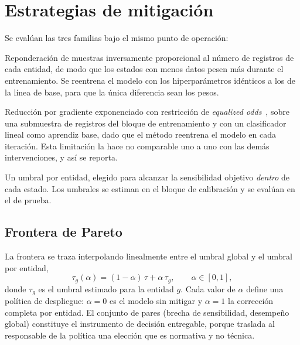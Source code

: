 \section{Estrategias de mitigación}

Se evalúan las tres familias bajo el mismo punto de operación:

\begin{description}[leftmargin=*,style=nextline]
  \item[Pre-procesamiento] Reponderación de muestras inversamente proporcional al
    número de registros de cada entidad, de modo que los estados con menos datos
    pesen más durante el entrenamiento. Se reentrena el modelo con los
    hiperparámetros idénticos a los de la línea de base, para que la única
    diferencia sean los pesos.
  \item[In-procesamiento] Reducción por gradiente exponenciado con restricción de
    \emph{equalized odds}~\parencite{fairlearn2020}, sobre una submuestra de
     registros del bloque de entrenamiento y con un clasificador
    lineal como aprendiz base, dado que el método reentrena el modelo en cada
    iteración. Esta limitación la hace no comparable uno a uno con las demás
    intervenciones, y así se reporta.
  \item[Post-procesamiento] Un umbral por entidad, elegido para alcanzar la
    sensibilidad objetivo \emph{dentro} de cada estado. Los umbrales se estiman en
    el bloque de calibración y se evalúan en el de prueba.
\end{description}

\subsection{Frontera de Pareto}

La frontera se traza interpolando linealmente entre el umbral global y el umbral
por entidad,
\begin{equation}
  \tau_g(\alpha) = (1-\alpha)\,\tau + \alpha\,\tau_g,
  \qquad \alpha \in [0,1],
\end{equation}
donde $\tau_g$ es el umbral estimado para la entidad $g$. Cada valor de $\alpha$
define una política de despliegue: $\alpha=0$ es el modelo sin mitigar y
$\alpha=1$ la corrección completa por entidad. El conjunto de pares
(brecha de sensibilidad, desempeño global) constituye el instrumento de decisión
entregable, porque traslada al responsable de la política una elección que es
normativa y no técnica.

